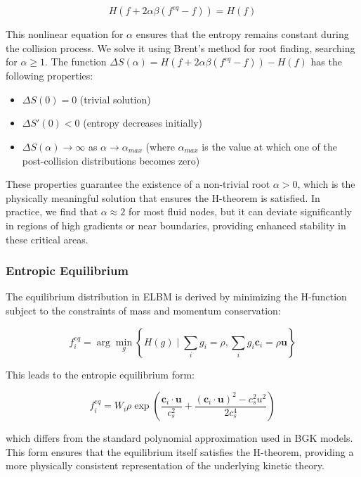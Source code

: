 \documentclass[12pt,a4paper]{article}
\begin{document}
\begin{equation}
H(f + 2\alpha\beta(f^{eq} - f)) = H(f)
\end{equation}

This nonlinear equation for $\alpha$ ensures that the entropy remains constant during the collision process. We solve it using Brent's method for root finding, searching for $\alpha \geq 1$. The function $\Delta S(\alpha) = H(f + 2\alpha\beta(f^{eq} - f)) - H(f)$ has the following properties:
\begin{itemize}
    \item $\Delta S(0) = 0$ (trivial solution)
    \item $\Delta S'(0) < 0$ (entropy decreases initially)
    \item $\Delta S(\alpha) \to \infty$ as $\alpha \to \alpha_{max}$ (where $\alpha_{max}$ is the value at which one of the post-collision distributions becomes zero)
\end{itemize}

These properties guarantee the existence of a non-trivial root $\alpha > 0$, which is the physically meaningful solution that ensures the H-theorem is satisfied. In practice, we find that $\alpha \approx 2$ for most fluid nodes, but it can deviate significantly in regions of high gradients or near boundaries, providing enhanced stability in these critical areas.

\subsubsection{Entropic Equilibrium}

The equilibrium distribution in ELBM is derived by minimizing the H-function subject to the constraints of mass and momentum conservation:

\begin{equation}
f_i^{eq} = \arg\min_{g} \left\{ H(g) \mid \sum_i g_i = \rho, \sum_i g_i \mathbf{c}_i = \rho\mathbf{u} \right\}
\end{equation}

This leads to the entropic equilibrium form:

\begin{equation}
f_i^{eq} = W_i \rho \exp\left(\frac{\mathbf{c}_i \cdot \mathbf{u}}{c_s^2} + \frac{(\mathbf{c}_i \cdot \mathbf{u})^2 - c_s^2 u^2}{2c_s^4}\right)
\end{equation}

which differs from the standard polynomial approximation used in BGK models. This form ensures that the equilibrium itself satisfies the H-theorem, providing a more physically consistent representation of the underlying kinetic theory.
\end{document}

